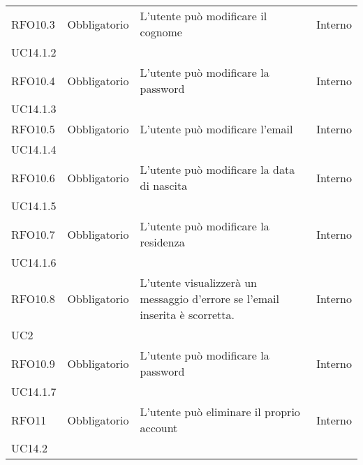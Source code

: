 \begin{longtable}{ >{\centering}p{} >{\centering}p{}
		>{\raggedright}p{} >{\centering}p{}}
	RFO10.3	&	Obbligatorio	&	L'utente può modificare il cognome	&	Interno \\ UC14.1.2	\tabularnewline
	RFO10.4	&	Obbligatorio	&	L'utente può modificare la password	&	Interno \\ UC14.1.3	\tabularnewline
	RFO10.5	&	Obbligatorio	&	L'utente può modificare l'email	&	Interno \\ UC14.1.4	\tabularnewline
	RFO10.6	&	Obbligatorio	&	L'utente può modificare la data di nascita	&	Interno \\ UC14.1.5	\tabularnewline
	RFO10.7	&	Obbligatorio	&	L'utente può modificare la residenza	&	Interno  \\ UC14.1.6	\tabularnewline
	RFO10.8	&	Obbligatorio	&	L'utente visualizzerà un messaggio d'errore se l'email inserita è scorretta.	&	Interno \\ UC2	\tabularnewline
	RFO10.9	&	Obbligatorio	&	L'utente può modificare la password	&	Interno  \\ UC14.1.7	\tabularnewline
	RFO11	&	Obbligatorio	&	L'utente può eliminare il proprio account	&	Interno  \\ UC14.2	\tabularnewline
	
\end{longtable}


